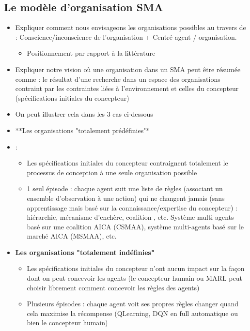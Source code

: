 \subsection{Le modèle d'organisation SMA}
\begin{itemize}

    \item Expliquer comment nous envisageons les organisations possibles au travers de : Conscience/inconscience de l'organisation + Centré agent / organisation.
          \begin{itemize}
              \item Positionnement par rapport à la littérature
          \end{itemize}
    \item Expliquer notre vision où une organisation dans un SMA peut être résumée comme : le résultat d'une recherche dans un espace des organisations contraint par les contraintes liées à l'environnement et celles du concepteur (spécifications initiales du concepteur)
    \item On peut illustrer cela dans les 3 cas ci-dessous
    \item **Les organisations "totalement prédéfinies"*\item :
          \begin{itemize}
              \item Les spécifications initiales du concepteur contraignent totalement le processus de conception à une seule organisation possible
              \item 1 seul épisode : chaque agent suit une liste de règles (associant un ensemble d'observation à une action) qui ne changent jamais (sans apprentissage mais basé sur la connaissance/expertise du concepteur) : hiérarchie, mécanisme d'enchère, coalition , etc.
                    Système multi-agents basé sur une coalition AICA (CSMAA), système multi-agents basé sur le marché AICA (MSMAA), etc.
          \end{itemize}
    \item \textbf{Les organisations "totalement indéfinies"}
          \begin{itemize}
              \item Les spécifications initiales du concepteur n'ont aucun impact sur la façon dont on peut concevoir les agents (le concepteur humain ou MARL peut choisir librement comment concevoir les règles des agents)
              \item Plusieurs épisodes : chaque agent voit ses propres règles changer quand cela maximise la récompense (QLearning, DQN en full automatique ou bien le concepteur humain)

\end{itemize}
\end{itemize}
